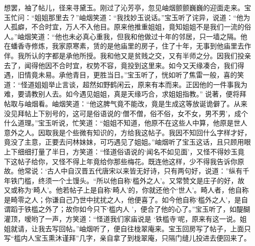 \begin{parag}
    想罢，袖了帖儿，径来寻黛玉。刚过了沁芳亭，忽见岫烟颤颤巍巍的迎面走来。宝玉忙问：“姐姐那里去？”岫烟笑道：“我找妙玉说话。”宝玉听了诧异，说道：“他为人孤癖，不合时宜，万人不入他目。原来他推重姐姐，竟知姐姐不是我们一流的俗人。”岫烟笑道：“他也未必真心重我，但我和他做过十年的邻居，只一墙之隔。他在蟠香寺修炼，我家原寒素，赁的是他庙里的房子，住了十年，无事到他庙里去作伴。我所认的字都是承他所授。我和他又是贫贱之交，又有半师之分。因我们投亲去了，闻得他因不合时宜，权势不容，竟投到这里来。如今又天缘凑合，我们得遇，旧情竟未易。承他青目，更胜当日。”宝玉听了，恍如听了焦雷一般，喜的笑道：“怪道姐姐举止言谈，超然如野鹤闲云，原来有本而来。正因他的一件事我为难，要请教别人去。如今遇见姐姐，真是天缘巧合，求姐姐指教。” 说著，便将拜帖取与岫烟看。岫烟笑道：“他这脾气竟不能改，竟是生成这等放诞诡僻了。从来没见拜帖上下别号的，这可是俗语说的‘僧不僧，俗不俗，女不女，男不男’，成个什么道理。”宝玉听说，忙笑道：“姐姐不知道，他原不在这些人中算，他原是世人意外之人。因取我是个些微有知识的，方给我这帖子。我因不知回什么字样才好，竟没了主意，正要去问林妹妹，可巧遇见了姐姐。”岫烟听了宝玉这话，且只顾用眼上下细细打量了半日，方笑道：“怪道俗语说的‘闻名不如见面’，又怪不得妙玉竟下这帖子给你，又怪不得上年竟给你那些梅花。既连他这样，少不得我告诉你原故。他常说：‘古人中自汉晋五代唐宋以来皆无好诗，只有两句好，说道：”纵有千年铁门槛，终须一个土馒头。“所以他自称‘槛外之人’。又常赞文是庄子的好，故又或称为‘畸人’。他若帖子上是自称‘畸人’的，你就还他个‘世人’。畸人者，他自称是畸零之人；你谦自己乃世中扰扰之人，他便喜了。如今他自称‘槛外之人’，是自谓蹈于铁槛之外了；故你如今只下‘槛内人 ’，便合了他的心了。”宝玉听了，如醍醐灌顶，嗳哟了一声，方笑道：“怪道我们家庙说是 ‘铁槛寺’呢，原来有这一说。姐姐就请，让我去写回帖。”岫烟听了，便自往栊翠庵来。宝玉回房写了帖子，上面只写“槛内人宝玉熏沐谨拜”几字，亲自拿了到栊翠庵，只隔门缝儿投进去便回来了。
\end{parag}


